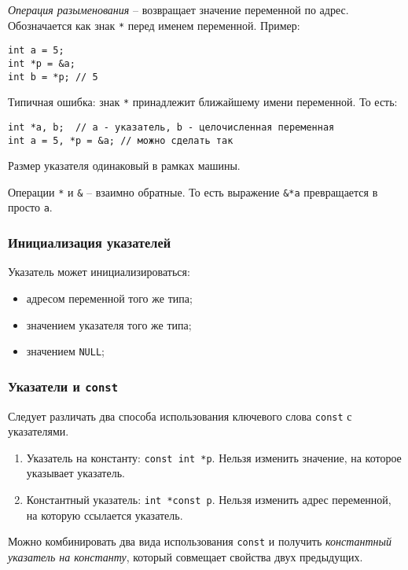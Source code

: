 \textit{Операция разыменования} -- возвращает значение переменной по адрес. Обозначается как знак \texttt{*} перед именем переменной. Пример:
\begin{verbatim}
int a = 5;
int *p = &a;
int b = *p; // 5
\end{verbatim}

\begin{note}
  Типичная ошибка: знак \texttt{*} принадлежит ближайшему имени переменной. То есть:
  \begin{verbatim}
int *a, b;  // a - указатель, b - целочисленная переменная
int a = 5, *p = &a; // можно сделать так
  \end{verbatim}
\end{note}

Размер указателя одинаковый в рамках машины.

Операции \texttt{*} и \texttt{\&} -- взаимно обратные. То есть выражение \texttt{\&*a} превращается в просто \texttt{a}.

\subsubsection{Инициализация указателей}

Указатель может инициализироваться:
\begin{itemize}
  \item адресом переменной того же типа;
  \item значением указателя того же типа;
  \item значением \texttt{NULL};
\end{itemize}

\subsubsection{Указатели и \texttt{const}}

Следует различать два способа использования ключевого слова \texttt{const} с указателями.

\begin{enumerate}
  \item Указатель на константу: \texttt{const int *p}. Нельзя изменить значение, на которое указывает указатель.
  \item Константный указатель: \texttt{int *const p}. Нельзя изменить адрес переменной, на которую ссылается указатель.
\end{enumerate}

Можно комбинировать два вида использования \texttt{const} и получить \textit{константный указатель на константу}, который совмещает свойства двух предыдущих. 

